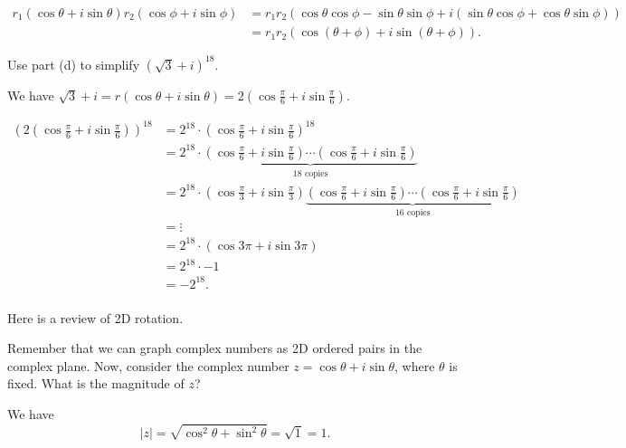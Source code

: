 \documentclass[../gatm_answers.tex]{subfiles}
\begin{document}
\begin{align*}
r_1(\cos\theta + i\sin\theta)r_2(\cos\phi + i\sin\phi) &= r_1r_2(\cos\theta\cos\phi - \sin\theta\sin\phi + i(\sin\theta\cos\phi + \cos\theta\sin\phi)) \\
&= r_1r_2(\cos(\theta+\phi) + i \sin(\theta+\phi)).
\end{align*}

\begin{inner_problem}
\item Use part (d) to simplify $(\sqrt{3}+i)^{18}$.
\end{inner_problem}

We have $\sqrt{3}+i=r(\cos\theta + i\sin\theta) = 2\left(\cos\frac{\pi}{6} + i\sin\frac{\pi}{6}\right)$.

\begin{align*}
(2\left(\cos\frac{\pi}{6} + i\sin\frac{\pi}{6}\right))^{18} &= 2^{18} \cdot \left(\cos\frac{\pi}{6} + i\sin\frac{\pi}{6}\right)^{18} \\
&= 2^{18}\cdot \underbrace{\left(\cos\frac{\pi}{6} + i\sin\frac{\pi}{6}\right)\cdots \left(\cos\frac{\pi}{6} + i\sin\frac{\pi}{6}\right)}_{18\text{ copies}} \\
&= 2^{18}\cdot \left(\cos\frac{\pi}{3} + i\sin\frac{\pi}{3}\right) \underbrace{\left(\cos\frac{\pi}{6} + i\sin\frac{\pi}{6}\right)\cdots \left(\cos\frac{\pi}{6} + i\sin\frac{\pi}{6}\right)}_{16\text{ copies}} \\
&= \vdots \\
&= 2^{18}\cdot \left(\cos 3\pi + i\sin 3\pi\right) \\
&= 2^{18}\cdot -1 \\
&= -2^{18}. \\
\end{align*}

\begin{outer_problem}
\item Here is a review of 2D rotation.
\end{outer_problem}

\begin{inner_problem}[start=1]
\item Remember that we can graph complex numbers as 2D ordered pairs in the complex plane. Now, consider the complex number $z=\cos \theta + i\sin\theta$, where $\theta$ is fixed. What is the magnitude of $z$?
\end{inner_problem}

We have $$|z|=\sqrt{\cos^2\theta + \sin^2\theta}=\sqrt{1}=1.$$
\end{document}
